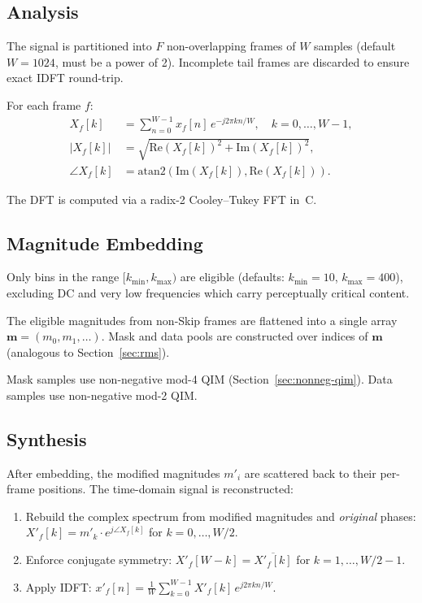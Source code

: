 \documentclass[11pt,a4paper]{article}
\begin{document}
\subsection{Analysis}

The signal is partitioned into $F$ non-overlapping frames of $W$ samples
(default $W = 1024$, must be a power of 2).  Incomplete tail frames are
discarded to ensure exact IDFT round-trip.

For each frame $f$:
\begin{align}
    X_f[k] &= \sum_{n=0}^{W-1} x_f[n] \, e^{-j 2\pi k n / W}, \quad k = 0, \ldots, W-1, \\
    |X_f[k]| &= \sqrt{\mathrm{Re}(X_f[k])^2 + \mathrm{Im}(X_f[k])^2}, \\
    \angle X_f[k] &= \mathrm{atan2}(\mathrm{Im}(X_f[k]), \mathrm{Re}(X_f[k])).
\end{align}

The DFT is computed via a radix-2 Cooley--Tukey FFT in~C.

\subsection{Magnitude Embedding}

Only bins in the range $[k_{\min}, k_{\max})$ are eligible (defaults:
$k_{\min} = 10$, $k_{\max} = 400$), excluding DC and very low frequencies
which carry perceptually critical content.

The eligible magnitudes from non-Skip frames are flattened into a single
array $\mathbf{m} = (m_0, m_1, \ldots)$.  Mask and data pools are
constructed over indices of $\mathbf{m}$ (analogous to Section~\ref{sec:rms}).

Mask samples use non-negative mod-4 QIM (Section~\ref{sec:nonneg-qim}).
Data samples use non-negative mod-2 QIM.

\subsection{Synthesis}

After embedding, the modified magnitudes $m'_i$ are scattered back to
their per-frame positions.  The time-domain signal is reconstructed:
\begin{enumerate}
    \item Rebuild the complex spectrum from modified magnitudes and
          \emph{original} phases:
          $X'_f[k] = m'_k \cdot e^{j \angle X_f[k]}$ for $k = 0, \ldots, W/2$.
    \item Enforce conjugate symmetry: $X'_f[W-k] = \overline{X'_f[k]}$
          for $k = 1, \ldots, W/2-1$.
    \item Apply IDFT: $x'_f[n] = \frac{1}{W} \sum_{k=0}^{W-1} X'_f[k] \, e^{j 2\pi kn / W}$.
\end{enumerate}
\end{document}

